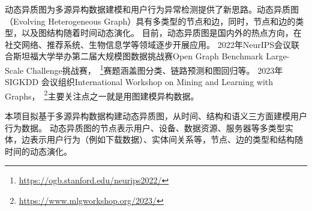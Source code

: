 动态异质图为多源异构数据建模和用户行为异常检测提供了新思路。动态异质图（Evolving Heterogeneous Graph）具有多类型的节点和边，同时，节点和边的类型，以及图结构随着时间动态演化。
目前，动态异质图是国内外的热点方向，在社交网络、推荐系统、生物信息学等领域逐步开展应用。
2022年NeurIPS会议联合斯坦福大学举办第二届大规模图数据挑战赛Open Graph Benchmark Large-Scale Challenge挑战赛，~\footnote{\url{https://ogb.stanford.edu/neurips2022/}}赛题涵盖图分类、链路预测和图回归等。
2023年SIGKDD 会议组织International Workshop on Mining and Learning with Graphs，~\footnote{\url{https://www.mlgworkshop.org/2023/}}主要关注点之一就是用图建模异构数据。

本项目拟基于多源异构数据构建动态异质图，从时间、结构和语义三方面建模用户行为数据。
动态异质图的节点表示用户、设备、数据资源、服务器等多类型实体，边表示用户行为（例如下载数据）、实体间关系等，节点、边的类型和结构随时间的动态演化。





\begin{comment}
异质网络（Heterogeneous Network），又称异质信息网络，是一种节点和边类型多样，用来描述现实世界中实体和实体间关系的数据结构。
在异质网络中，节点和边通常有多种类型，分别表示不同类型的实体和实体间关系，如在网上购物平台中，用户和商品是两种不同类型的节点，点击、收藏、购买等行为可以用不同类型的实体间关系来表达。
与单一类型的同质网络相比，异质网络具有更强的表达能力，能更好地描述现实世界，已经广泛用于推荐系统、社交网络、生物信息学等领域。
为进一步建立对异质网络时序演化的认知，动态异质网络应运而生。
在异质网络的基础上，动态异质网络为节点和边增加了时间属性，不同时刻节点和边的类型可能不同，网络结构也会随时间演化。
因此，动态异质网络可以更好地刻画现实数据场景，如用户行为的持续建模、事件演化分析和患者病情进展建模等。
动态异质网络从结构、语义和时序演化三方面刻画现实数据场景，有助于建模各类信息系统的多源异构用户数据。
\end{comment}



